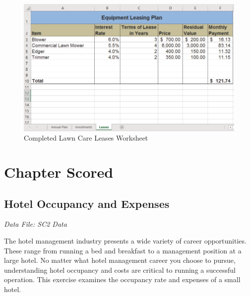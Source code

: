 \begin{figure}[H]
	\centering
	\includegraphics[width=\maxwidth{.95\linewidth}]{gfx/ch02_fig49}
	\caption{Completed Lawn Care Leases Worksheet}
	\label{02:fig49}
\end{figure}

\section{Chapter Scored}

\subsection{Hotel Occupancy and Expenses}

\textit{Data File: SC2 Data}

The hotel management industry presents a wide variety of career opportunities. These range from running a bed and breakfast to a management position at a large hotel. No matter what hotel management career you choose to pursue, understanding hotel occupancy and costs are critical to running a successful operation. This exercise examines the occupancy rate and expenses of a small hotel.

